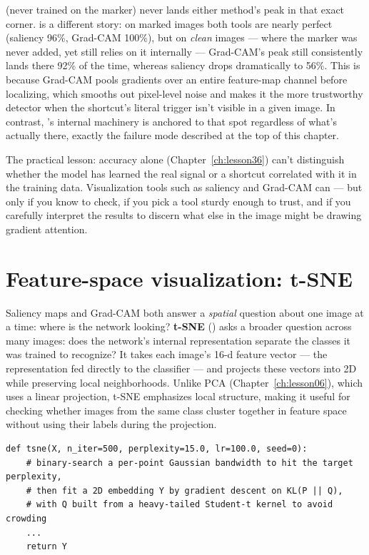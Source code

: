  (never trained on the marker) never lands either method's peak in that exact corner.  is a different story: on marked images both tools are nearly perfect (saliency 96\%, Grad-CAM 100\%), but on \emph{clean} images --- where the marker was never added, yet  still relies on it internally --- Grad-CAM's peak still consistently lands there 92\% of the time, whereas saliency drops dramatically to 56\%. This is because Grad-CAM pools gradients over an entire feature-map channel before localizing, which smooths out pixel-level noise and makes it the more trustworthy detector when the shortcut's literal trigger isn't visible in a given image. In contrast, 's internal machinery is anchored to that spot regardless of what's actually there, exactly the failure mode described at the top of this chapter.

The practical lesson: accuracy alone (Chapter~\ref{ch:lesson36}) can't distinguish whether the model has learned the real signal or a shortcut correlated with it in the training data. Visualization tools such as saliency and Grad-CAM can --- but only if you know to check, if you pick a tool sturdy enough to trust, and if you carefully interpret the results to discern what else in the image might be drawing gradient attention.

\section{Feature-space visualization: t-SNE}

Saliency maps and Grad-CAM both answer a \emph{spatial} question about one image at a time: where is the network looking? \textbf{t-SNE} () asks a broader question across many images: does the network's internal representation separate the classes it was trained to recognize? It takes each image's 16-d feature vector --- the representation fed directly to the classifier --- and projects these vectors into 2D while preserving local neighborhoods. Unlike PCA (Chapter~\ref{ch:lesson06}), which uses a linear projection, t-SNE emphasizes local structure, making it useful for checking whether images from the same class cluster together in feature space without using their labels during the projection.

\begin{lstlisting}
def tsne(X, n_iter=500, perplexity=15.0, lr=100.0, seed=0):
    # binary-search a per-point Gaussian bandwidth to hit the target perplexity,
    # then fit a 2D embedding Y by gradient descent on KL(P || Q),
    # with Q built from a heavy-tailed Student-t kernel to avoid crowding
    ...
    return Y
\end{lstlisting}

